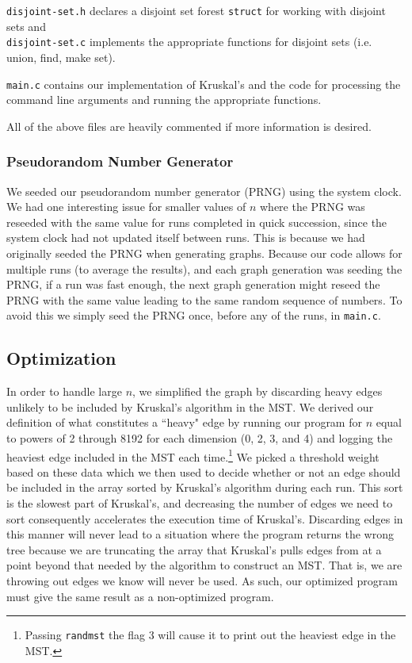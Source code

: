 \documentclass[solution, letterpaper]{cs121}
\begin{document}
\texttt{disjoint-set.h} declares a disjoint set forest \texttt{struct} for working with disjoint sets and\\ \texttt{disjoint-set.c} implements
the appropriate functions for disjoint sets (i.e. union, find, make set).

\texttt{main.c} contains our implementation of Kruskal's and the code for processing the command line arguments and running the appropriate functions.

All of the above files are heavily commented if more information is desired.

\subsubsection*{Pseudorandom Number Generator}
\hspace{5mm} We seeded our pseudorandom number generator (PRNG) using the system clock. We had one interesting issue for smaller values of $n$ where the PRNG was reseeded with the same value for runs completed in quick succession, since the system clock had not updated itself between runs. This is because we had originally seeded the PRNG when generating graphs. Because our code allows for multiple runs (to average the results), and each graph generation was seeding the PRNG, if a run was fast enough, the next graph generation might reseed the PRNG with the same value leading to the same random sequence of numbers. To avoid this we simply seed the PRNG once, before any of the runs, in \texttt{main.c}.

\subsection*{Optimization}
\hspace{5mm} In order to handle large $n$, we simplified the graph by discarding heavy edges unlikely to be included by Kruskal's algorithm in the MST. We derived our definition of what constitutes a 	``heavy" edge by running our program for $n$ equal to powers of 2 through 8192 for each dimension (0, 2, 3, and 4) and logging the heaviest edge included in the MST each time.\footnote{Passing {\tt randmst} the flag 3 will cause it to print out the heaviest edge in the MST.} We picked a threshold weight based on these data which we then used to decide whether or not an edge should be included in the array sorted by Kruskal's algorithm during each run. This sort is the slowest part of Kruskal's, and decreasing the number of edges we need to sort consequently accelerates the execution time of Kruskal's. Discarding edges in this manner will never lead to a situation where the program returns the wrong tree because we are truncating the array that Kruskal's pulls edges from at a point beyond that needed by the algorithm to construct an MST. That is, we are throwing out edges we know will never be used. As such, our optimized program must give the same result as a non-optimized program.
\end{document}
